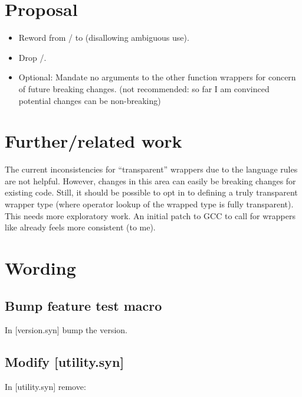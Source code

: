 \section{Proposal}
\begin{itemize}
  \item Reword  from / to
     (disallowing ambiguous  use).

  \item Drop /.

  \item Optional: Mandate no  arguments to the other function wrappers for
    concern of future breaking changes. (not recommended: so far I am convinced potential changes
    can be non-breaking)
\end{itemize}

\section{Further/related work}
The current inconsistencies for “transparent” wrappers due to the language rules are not helpful.
However, changes in this area can easily be breaking changes for existing code.
Still, it should be possible to opt in to defining a truly transparent wrapper type (where
operator lookup of the wrapped type is fully transparent).
This needs more exploratory work.
An initial patch to GCC to call  for wrappers like  already
feels more consistent (to me).

\section{Wording}

\subsection{Bump feature test macro}

In [version.syn] bump the  version.

\subsection{Modify [utility.syn]}

In [utility.syn] remove:

